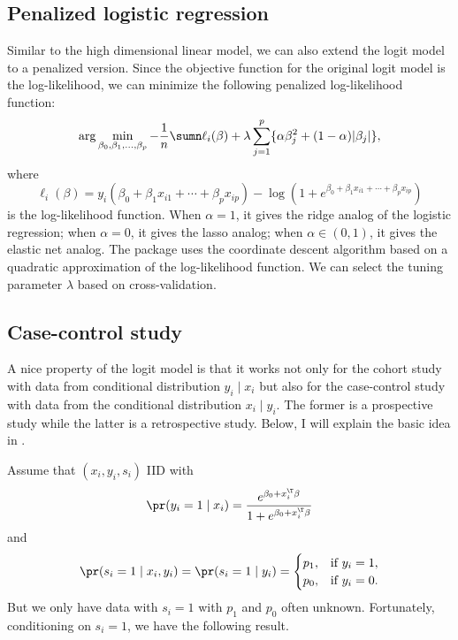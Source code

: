 \subsection{Penalized logistic regression}


Similar to the high dimensional linear model, we can also extend the logit model to a penalized version. Since the objective function for the original logit model is the log-likelihood, we can minimize the following penalized log-likelihood function: 
\[
\arg\min_{\beta_0,\beta_1, \ldots, \beta_p}-\frac{1}{n}\sumn \ell_i(\beta )   +\lambda\sum_{j=1}^{p} \{  \alpha \beta_j^2 + (1-\alpha)  |\beta_{j}| \} ,
\]
where 
$$
\ell_i(\beta) = y_{i}(\beta_{0}+\beta_{1}x_{i1}+\cdots+\beta_{p}x_{ip})-\log(1+e^{\beta_{0}+\beta_{1}x_{i1}+\cdots+\beta_{p}x_{ip}})
$$ 
is the log-likelihood function. When $\alpha = 1$, it gives the ridge analog of the logistic regression; when $\alpha = 0$, it gives the lasso analog; when $\alpha \in (0,1)$, it gives the elastic net analog. 
The  package  uses the coordinate descent algorithm based on a quadratic
approximation of the log-likelihood function. We can select the tuning parameter $\lambda$ based on cross-validation. 

\subsection{Case-control study}\label{sec::case-control-study}


A nice property of the logit model is that it works not only for  the cohort study with data from conditional distribution $y_i\mid x_i$ but also for the case-control study with data from the conditional distribution $x_i\mid y_i$. The former is a prospective study while the latter is a retrospective study. Below, I will explain the basic idea in \citet{prentice1979logistic}. 


Assume that $(x_{i},y_{i},s_{i})$ IID with 
\begin{eqnarray}
\label{eq::cc=1}
\pr(y_i = 1\mid x_i) =  \frac{e^{\beta_{0}+x_{i}^{\T}\beta}}{1+e^{\beta_{0}+x_{i}^{\T}\beta}} 
\end{eqnarray}
and
\begin{eqnarray}
\label{eq::cc=2}
\pr(s_{i}=1\mid x_{i},y_{i})=\pr(s_{i}=1\mid y_{i})=\begin{cases}
p_{1}, & \text{if }y_{i}=1,\\
p_{0}, & \text{if }y_{i}=0.
\end{cases}
\end{eqnarray}
But we only have data with $s_{i}=1$ with $p_{1}$ and $p_{0}$ often
unknown. Fortunately, conditioning on $s_{i}=1$, we have the following result. 

